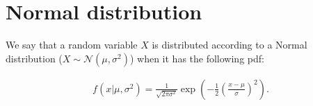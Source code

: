 \section{Normal distribution}\label{sec:normaldist}

We say that a random variable $X$ is distributed according to a Normal distribution ($X \sim \mathcal{N}(\mu, \sigma^2)$) when it has the following \gls{pdf}:

\begin{definition}
    \begin{align*}
        f(x|\mu, \sigma^2) = \frac{1}{\sqrt{2\pi\sigma^2}} \exp{\left(-\frac{1}{2}\left(\frac{x-\mu}{\sigma}\right)^2\right)}.
    \end{align*}
\end{definition}